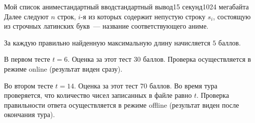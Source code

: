 \begin{problem}{Мой список аниме}{стандартный ввод}{стандартный вывод}{15 секунд}{1024 мегабайта}
    Далее следуют $n$ строк, $i$-я из которых содержит непустую строку $s_i$, состоящую из строчных латинских букв~--- название соответствующего аниме.

    За каждую правильно найденную максимальную длину начисляется $5$ баллов.

    В первом тесте $t = 6$. Оценка за этот тест $30$ баллов. Проверка осуществляется в режиме online (результат виден сразу).

    Во втором тесте $t = 14$. Оценка за этот тест $70$ баллов. Во время тура проверяется, что количество чисел записанных в файле равно $t$. Проверка правильности ответа осуществляется в режиме offline (результат виден после окончания тура).

    \Example

    \begin{example}
    \end{example}

\end{problem}